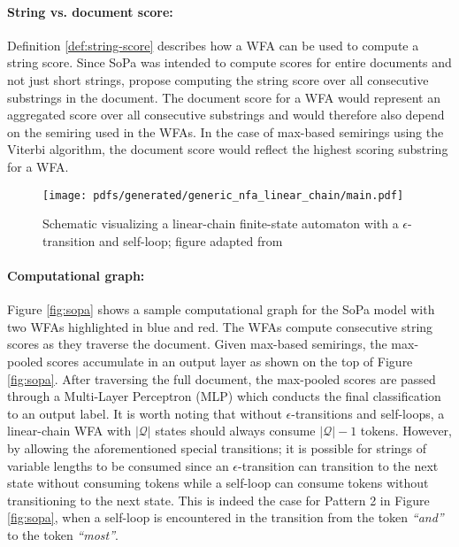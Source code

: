 \paragraph{String vs. document score:} Definition \ref{def:string-score}
describes how a WFA can be used to compute a string score. Since SoPa was
intended to compute scores for entire documents and not just short strings,
\citet{schwartz2018sopa} propose computing the string score over all consecutive
substrings in the document. The document score for a WFA would represent an
aggregated score over all consecutive substrings and would therefore also depend
on the semiring used in the WFAs. In the case of max-based semirings using the
Viterbi algorithm, the document score would reflect the highest scoring
substring for a WFA.

\begin{figure}[t]
  \centering
  \texttt{[image: pdfs/generated/generic\_nfa\_linear\_chain/main.pdf]}
  \caption{Schematic visualizing a linear-chain finite-state automaton with
    a $\epsilon$-transition and self-loop; figure adapted from \citet{schwartz2018sopa}}
  \label{fig:fsa}
\end{figure}

\paragraph{Computational graph:} Figure \ref{fig:sopa} shows a sample
computational graph for the SoPa model with two WFAs highlighted in blue and
red. The WFAs compute consecutive string scores as they traverse the document.
Given max-based semirings, the max-pooled scores accumulate in an output layer
as shown on the top of Figure \ref{fig:sopa}. After traversing the full
document, the max-pooled scores are passed through a Multi-Layer Perceptron
(MLP) which conducts the final classification to an output label. It is worth
noting that without $\epsilon$-transitions and self-loops, a linear-chain WFA
with $|\mathcal{Q}|$ states should always consume $\mathcal{|Q|}-1$ tokens.
However, by allowing the aforementioned special transitions; it is possible for
strings of variable lengths to be consumed since an $\epsilon$-transition can
transition to the next state without consuming tokens while a self-loop can
consume tokens without transitioning to the next state. This is indeed the case
for Pattern 2 in Figure \ref{fig:sopa}, when a self-loop is encountered in the
transition from the token \textit{``and''} to the token \textit{``most''}.

